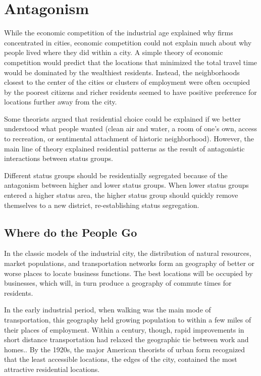 \section*{Antagonism}
While the economic competition of the industrial age explained why
firms concentrated in cities, economic competition could not explain
much about why people lived where they did within a city. A simple
theory of economic competition would predict that the locations that
minimized the total travel time would be dominated by the
wealthiest residents. Instead, the neighborhoods closest to the center
of the cities or clusters of employment were often occupied by the
poorest citizens and richer residents seemed to have positive preference
for locations further away from the city.

Some theorists argued that residential choice could be explained
if we better understood what people wanted (clean air and
water, a room of one's own, access to recreation, or sentimental
attachment of historic neighborhood). However, the main line of theory
explained residential patterns as the result of antagonistic
interactions between status groups.

Different status groups should be residentially segregated because
of the antagonism between higher and lower status groups. When lower
status groups entered a higher status area, the higher status group
should quickly remove themselves to a new district, re-establishing
status segregation.

\subsection*{Where do the People Go}
In the classic models of the industrial city, the distribution of
natural resources, market populations, and transportation networks
form an geography of better or worse places to locate business
functions. The best locations will be occupied by businesses, which
will, in turn produce a geography of commute times for residents.

In the early industrial period, when walking was the main mode of
transportation, this geography held growing population to within a
few miles of their places of employment. Within a century, though,
rapid improvements in short distance transportation had relaxed the
geographic tie between work and homes.\cite{hawley_urban_1981}. By
the 1920s, the major American theorists of urban form recognized that
the least accessible locations, the edges of the city, contained the
most attractive residential locations.\cite{park_growth_1984,hoyt_one_1970}


